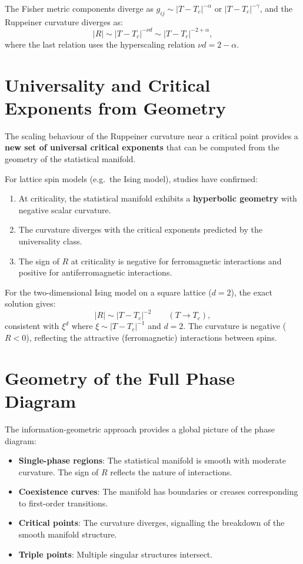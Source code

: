 The Fisher metric components diverge as $g_{ij} \sim |T - T_c|^{-\alpha}$ or $|T - T_c|^{-\gamma}$, and the Ruppeiner curvature diverges as:
\begin{equation}
|R| \sim |T - T_c|^{-\nu d} \sim |T - T_c|^{-2 + \alpha},
\end{equation}
where the last relation uses the hyperscaling relation $\nu d = 2 - \alpha$.

\section{Universality and Critical Exponents from Geometry}

The scaling behaviour of the Ruppeiner curvature near a critical point provides a \textbf{new set of universal critical exponents} that can be computed from the geometry of the statistical manifold.

For lattice spin models (e.g.\ the Ising model), studies have confirmed:
\begin{enumerate}
\item At criticality, the statistical manifold exhibits a \textbf{hyperbolic geometry} with negative scalar curvature.
\item The curvature diverges with the critical exponents predicted by the universality class.
\item The sign of $R$ at criticality is negative for ferromagnetic interactions and positive for antiferromagnetic interactions.
\end{enumerate}

\begin{example}
For the two-dimensional Ising model on a square lattice ($d = 2$), the exact solution gives:
\begin{equation}
|R| \sim |T - T_c|^{-2} \qquad (T \to T_c),
\end{equation}
consistent with $\xi^d$ where $\xi \sim |T - T_c|^{-1}$ and $d = 2$. The curvature is negative ($R < 0$), reflecting the attractive (ferromagnetic) interactions between spins.
\end{example}

\section{Geometry of the Full Phase Diagram}

The information-geometric approach provides a global picture of the phase diagram:

\begin{itemize}
\item \textbf{Single-phase regions}: The statistical manifold is smooth with moderate curvature. The sign of $R$ reflects the nature of interactions.
\item \textbf{Coexistence curves}: The manifold has boundaries or creases corresponding to first-order transitions.
\item \textbf{Critical points}: The curvature diverges, signalling the breakdown of the smooth manifold structure.
\item \textbf{Triple points}: Multiple singular structures intersect.
\end{itemize}

